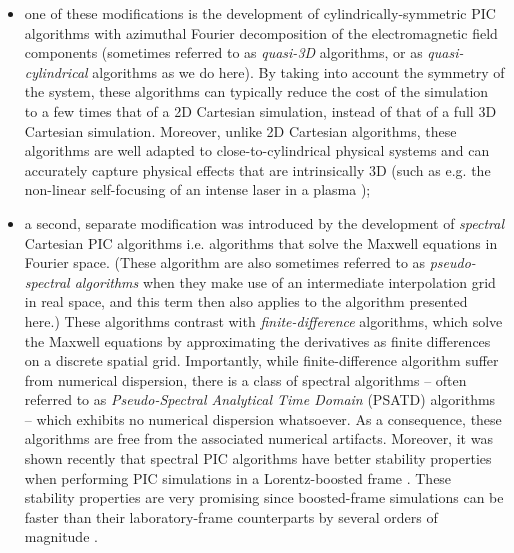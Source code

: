\documentclass[1p,times]{elsarticle}
\begin{document}
\begin{itemize}
\item one of these modifications is the development of cylindrically-symmetric
PIC algorithms with azimuthal Fourier decomposition \citep{godfrey1985iprop,Lifschitz,Davidson} 
of the electromagnetic field components 
(sometimes referred to as \emph{quasi-3D} algorithms, or as
\emph{quasi-cylindrical} algorithms as we do here). By taking
into account the symmetry of the system, these algorithms can typically reduce
the cost of the simulation to a few times that of a 2D Cartesian simulation,
instead of that of a full 3D Cartesian simulation. Moreover, unlike 2D
Cartesian algorithms, these algorithms are well adapted to close-to-cylindrical
physical systems and can accurately capture physical effects that are intrinsically
3D (such as e.g. the non-linear self-focusing of an intense laser in a
plasma \citep{EsareyRMP2009});

\item a second, separate modification was introduced by the development
  of \emph{spectral} Cartesian PIC algorithms
  \citep{Haber,BunemanJCP1980,DawsonRMP1983,Liu} i.e. algorithms that solve the
  Maxwell equations in Fourier space. (These algorithm are also sometimes referred to as
  \emph{pseudo-spectral algorithms} when they make use of an
  intermediate interpolation grid in real space, and this term then
  also applies to the algorithm presented here.) These algorithms contrast with
  \emph{finite-difference} algorithms, which solve the Maxwell equations
  by approximating the derivatives as finite differences on a discrete spatial grid.
Importantly, while finite-difference algorithm suffer from
numerical dispersion, there is a class of spectral algorithms -- often referred to
as \emph{Pseudo-Spectral Analytical Time Domain} (PSATD) algorithms 
\citep{Haber,BunemanJCP1980} -- which exhibits no numerical dispersion whatsoever. As a
consequence, these algorithms are free from the associated numerical
artifacts. Moreover, it was shown recently
\citep{GodfreyJCP2014,GodfreyIEEE2014,YuJCP2014,YuCPC2015} 
that spectral PIC algorithms have better stability properties when 
performing PIC simulations in
a Lorentz-boosted frame \citep{VayPRL2007,MartinsNatPhys2010,VayJCP2011}. 
These stability properties are very
promising since boosted-frame simulations can be faster than 
their laboratory-frame counterparts by several orders of magnitude \citep{VayPRL2007}.
\end{itemize}
\end{document}
